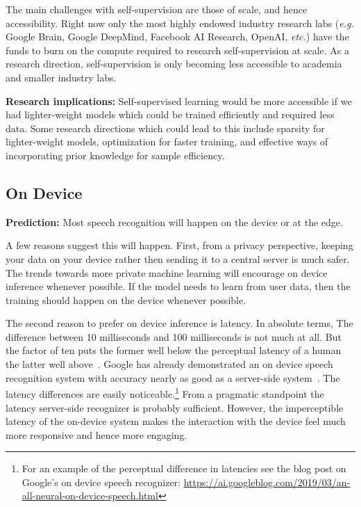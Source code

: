 The main challenges with self-supervision are those of scale, and hence
accessibility. Right now only the most highly endowed industry research labs
(\emph{e.g.} Google Brain, Google DeepMind, Facebook AI Research, OpenAI,
\emph{etc.}) have the funds to burn on the compute required to research
self-supervision at scale. As a research direction, self-supervision is only
becoming less accessible to academia and smaller industry labs.

{\bf Research implications:} Self-supervised learning would be more
accessible if we had lighter-weight models which could be trained efficiently
and required less data. Some research directions which could lead to
this include sparsity for lighter-weight models, optimization for faster
training, and effective ways of incorporating prior knowledge for sample
efficiency.

\subsection{On Device}
\label{sec:on_device}

{\bf Prediction:} Most speech recognition will happen on the device or at the
edge.

A few reasons suggest this will happen. First, from a privacy perspective,
keeping your data on your device rather then sending it to a central server
is much safer. The trends towards more private machine learning will encourage
on device inference whenever possible. If the model needs to learn from user
data, then the training should happen on the device whenever possible.

The second reason to prefer on device inference is latency. In absolute terms,
The difference between 10 milliseconds and 100 milliseconds is not much at all.
But the factor of ten puts the former well below the perceptual latency of a
human the latter well above~\citep{lago2004quest, levitin2000perception}.
Google has already demonstrated an on device speech recognition system with
accuracy nearly as good as a server-side system~\citep{he2019streaming}. The
latency differences are easily noticeable.\footnote{For an example of the
perceptual difference in latencies see the blog post on Google's on device
speech recognizer:
\url{https://ai.googleblog.com/2019/03/an-all-neural-on-device-speech.html}}
From a pragmatic standpoint the latency server-side recognizer is probably
sufficient. However, the imperceptible latency of the on-device system makes
the interaction with the device feel much more responsive and hence more
engaging.

